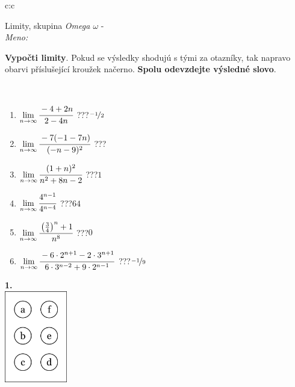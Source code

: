 \documentclass[10pt]{report}
\begin{document}
\begin{tabular}{c:c}
\begin{minipage}[c][104.5mm][t]{0.5\linewidth}
\begin{center}
\vspace{7mm}
{\huge Limity, skupina \textit{Omega $\omega$} -}\\[5mm]
\textit{Meno:}\phantom{xxxxxxxxxxxxxxxxxxxxxxxxxxxxxxxxxxxxxxxxxxxxxxxxxxxxxxxxxxxxxxxxx}\\[5mm]
\begin{minipage}{0.95\linewidth}
\begin{center}
\textbf{Vypočti limity}. Pokud se výsledky shodujú s tými za otazníky, tak napravo\\obarvi příslušející kroužek načerno. \textbf{Spolu odevzdejte výsledné slovo}.
\end{center}
\end{minipage}
\\[1mm]
\begin{minipage}{0.79\linewidth}
\begin{center}
\begin{varwidth}{\linewidth}
\begin{enumerate}
\normalsize
\item $\lim\limits_{n\to\infty}\cfrac{-4+2n}{2-4n}$\quad \dotfill\; ???\;\dotfill \quad $\nicefrac{-1}{2}$
\item $\lim\limits_{n\to\infty}\cfrac{-7(-1-7n)}{(-n-9)^2}$\quad \dotfill\; ???\;\dotfill {}
\item $\lim\limits_{n\to\infty}\cfrac{(1+n)^2}{n^2+8n-2}$\quad \dotfill\; ???\;\dotfill \quad $1$
\item $\lim\limits_{n\to\infty}\cfrac{4^{n-1}}{4^{n-4}}$\quad \dotfill\; ???\;\dotfill \quad $64$
\item $\lim\limits_{n\to\infty}\cfrac{\left(\frac{3}{4}\right)^n +1}{n^{8}}$\quad \dotfill\; ???\;\dotfill \quad $0$
\item $\lim\limits_{n\to\infty}\cfrac{-6\cdot 2^{n+1}-2\cdot 3^{n+1}}{6\cdot 3^{n-2}+9\cdot 2^{n-1}}$\quad \dotfill\; ???\;\dotfill \quad $\nicefrac{-1}{9}$
\end{enumerate}
\end{varwidth}
\end{center}
\end{minipage}
\begin{minipage}{0.20\linewidth}
\begin{center}
{\Huge\bfseries 1.} \\[2mm]
\includegraphics[height=40mm]{../images/braille.png}

\end{center}
\end{minipage}
\end{center}
\end{minipage}
\end{tabular}
\end{document}
